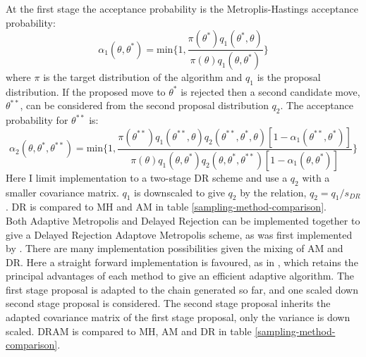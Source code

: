 At the first stage the acceptance probability is the Metroplis-Hastings acceptance probability:
\begin{equation}
	\alpha_1(\theta,\theta^*) = \text{min}\bigg\{1,\frac{\pi(\theta^*)q_1(\theta^*,\theta)}{\pi(\theta)q_1(\theta,\theta^*)} \bigg\}
\end{equation}
where $\pi$ is the target distribution of the algorithm and $q_1$ is the proposal distribution. If the proposed move to $\theta^*$ is rejected then a second candidate move, $\theta^{**}$, can be considered from the second proposal distribution $q_2$. The acceptance probability for $\theta^{**}$ is:
\begin{equation}
	\alpha_2(\theta,\theta^*,\theta^{**}) = \text{min}\bigg\{1,\frac{\pi(\theta^{**})q_1(\theta^{**},\theta)q_2(\theta^{**},\theta^*,\theta)[1-\alpha_1(\theta^{**},\theta^*)]}{\pi(\theta)q_1(\theta,\theta^*)q_2(\theta,\theta^*,\theta^{**})[1-\alpha_1(\theta,\theta^*)]} \bigg\}
\end{equation}
Here I limit implementation to a two-stage DR scheme and use a $q_2$ with a smaller covariance matrix. $q_1$ is downscaled to give $q_2$ by the relation, $q_2 = q_1/s_{DR}$. DR is compared to MH and AM in table \ref{sampling-method-comparison}.\\

Both Adaptive Metropolis and Delayed Rejection can be implemented together to give a Delayed Rejection Adaptove Metropolis scheme, as was first implemented by \citet{Laine2008}. There are many implementation possibilities given the mixing of AM and DR. Here a straight forward implementation is favoured, as in \citet{Laine2008}, which retains the principal advantages of each method to give an efficient adaptive algorithm.    The first stage proposal is adapted to the chain generated so far, and one scaled down second stage proposal is considered. The second stage proposal inherits the adapted covariance matrix of the first stage proposal, only the variance is down scaled. DRAM is compared to MH, AM and DR in table \ref{sampling-method-comparison}.\\

